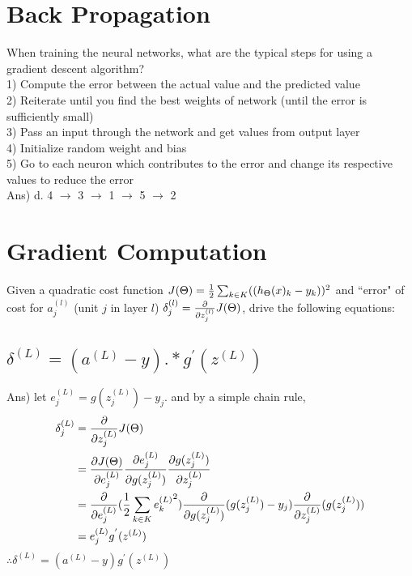 \documentclass[12pt]{article}%
\begin{document}
\section{Back Propagation}
When training the neural networks, what are the typical steps for using a gradient descent algorithm?\\
1) Compute the error between the actual value and the predicted value\\
2) Reiterate until you find the best weights of network (until the error is sufficiently small)\\
3) Pass an input through the network and get values from output layer\\
4) Initialize random weight and bias\\
5) Go to each neuron which contributes to the error and change its respective values to reduce the error\\

Ans) d. 4 $\rightarrow$ 3 $\rightarrow$ 1 $\rightarrow$ 5 $\rightarrow$ 2

\section{Gradient Computation}
Given a quadratic cost function $J(\Theta) = {1 \over 2} \sum_{k \in K} ((h_\Theta (x)_k - y_k ))^2$ and  ``error" of cost for $a^{(l)}_j$ (unit $j$ in layer $l$) $\delta^{(l)}_j = {\partial \over {\partial z^{(l)}_j}} J(\Theta)$, drive the following equations:
\subsection{$\delta^{(L)} = (a^{(L)} - y).*g^{'}(z^{(L)})$}
Ans) let $e^{(L)}_j = g(z^{(L)}_j) - y_j$. and by a simple chain rule, 
\begin{equation}
	\begin{aligned}
		\delta^{(L)}_j & = {\partial \over {\partial z^{(L)}_j }} J(\Theta) \\
		& = {\partial J(\Theta) \over {\partial e^{(L)}_j }} {\partial e^{(L)}_j \over {\partial g(z^{(L)}_j ) }} {\partial g(z^{(L)}_j ) \over {\partial z^{(L)}_j }} \\
		& = {\partial \over {\partial e^{(L)}_j }} ({1 \over 2} \sum_{k \in K} {e^{(L)}_k}^2 ) {\partial \over {\partial g(z^{(L)}_j )}} ( g(z^{(L)}_j) - y_j) {\partial \over {\partial z^{(L)}_j}} (g(z^{(L)}_j))\\
		& =  e^{(L)}_j g^{'}(z^{(L)})
	\end{aligned}
\end{equation}
$\therefore \delta^{(L)} = (a^{(L)} - y)g^{'}(z^{(L)})$
\end{document}
